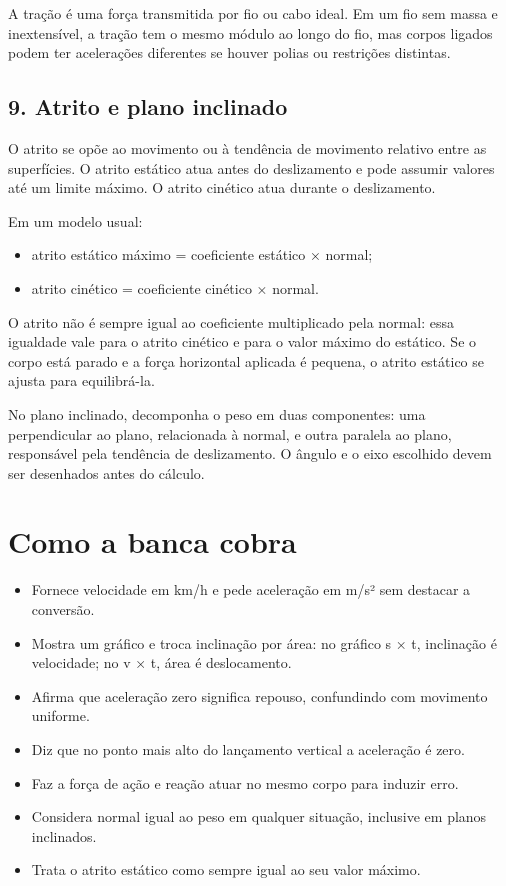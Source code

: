\documentclass[11pt,a4paper]{article}
\begin{document}
A tração é uma força transmitida por fio ou cabo ideal. Em um fio sem massa e inextensível, a tração tem o mesmo módulo ao longo do fio, mas corpos ligados podem ter acelerações diferentes se houver polias ou restrições distintas.

\subsection*{9. Atrito e plano inclinado}

O atrito se opõe ao movimento ou à tendência de movimento relativo entre as superfícies. O atrito estático atua antes do deslizamento e pode assumir valores até um limite máximo. O atrito cinético atua durante o deslizamento.

Em um modelo usual:

\begin{itemize}
  \item atrito estático máximo = coeficiente estático × normal;
  \item atrito cinético = coeficiente cinético × normal.
\end{itemize}

O atrito não é sempre igual ao coeficiente multiplicado pela normal: essa igualdade vale para o atrito cinético e para o valor máximo do estático. Se o corpo está parado e a força horizontal aplicada é pequena, o atrito estático se ajusta para equilibrá-la.

No plano inclinado, decomponha o peso em duas componentes: uma perpendicular ao plano, relacionada à normal, e outra paralela ao plano, responsável pela tendência de deslizamento. O ângulo e o eixo escolhido devem ser desenhados antes do cálculo.

\section*{Como a banca cobra}

\begin{itemize}
  \item Fornece velocidade em km/h e pede aceleração em m/s² sem destacar a conversão.
  \item Mostra um gráfico e troca inclinação por área: no gráfico s × t, inclinação é velocidade; no v × t, área é deslocamento.
  \item Afirma que aceleração zero significa repouso, confundindo com movimento uniforme.
  \item Diz que no ponto mais alto do lançamento vertical a aceleração é zero.
  \item Faz a força de ação e reação atuar no mesmo corpo para induzir erro.
  \item Considera normal igual ao peso em qualquer situação, inclusive em planos inclinados.
  \item Trata o atrito estático como sempre igual ao seu valor máximo.
\end{itemize}
\end{document}
